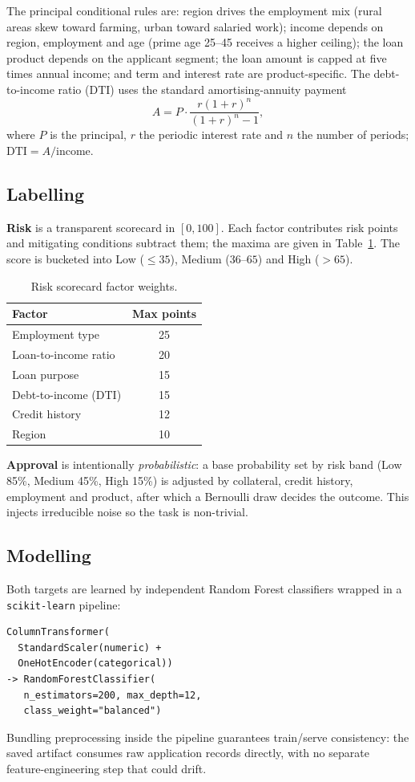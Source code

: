 \documentclass[conference]{IEEEtran}
\begin{document}
The principal conditional rules are: region drives the employment mix (rural
areas skew toward farming, urban toward salaried work); income depends on
region, employment and age (prime age 25--45 receives a higher ceiling); the
loan product depends on the applicant segment; the loan amount is capped at five
times annual income; and term and interest rate are product-specific. The
debt-to-income ratio (DTI) uses the standard amortising-annuity payment
\begin{equation}
A = P \cdot \frac{r(1+r)^{n}}{(1+r)^{n}-1},
\end{equation}
where $P$ is the principal, $r$ the periodic interest rate and $n$ the number of
periods; $\text{DTI} = A / \text{income}$.

\subsection{Labelling}
\textbf{Risk} is a transparent scorecard in $[0,100]$. Each factor contributes
risk points and mitigating conditions subtract them; the maxima are given in
Table~\ref{tab:scorecard}. The score is bucketed into Low ($\le 35$),
Medium ($36$--$65$) and High ($>65$).

\begin{table}[t]
\caption{Risk scorecard factor weights.}
\label{tab:scorecard}
\centering
\renewcommand{\arraystretch}{1.2}
\begin{tabular}{lc}
\toprule
\textbf{Factor} & \textbf{Max points} \\
\midrule
Employment type        & 25 \\
Loan-to-income ratio    & 20 \\
Loan purpose            & 15 \\
Debt-to-income (DTI)    & 15 \\
Credit history          & 12 \\
Region                  & 10 \\
\bottomrule
\end{tabular}
\end{table}

\textbf{Approval} is intentionally \emph{probabilistic}: a base probability set
by risk band (Low 85\%, Medium 45\%, High 15\%) is adjusted by collateral,
credit history, employment and product, after which a Bernoulli draw decides the
outcome. This injects irreducible noise so the task is non-trivial.

\subsection{Modelling}
Both targets are learned by independent Random Forest classifiers wrapped in a
\texttt{scikit-learn} pipeline:
\begin{lstlisting}
ColumnTransformer(
  StandardScaler(numeric) +
  OneHotEncoder(categorical))
-> RandomForestClassifier(
   n_estimators=200, max_depth=12,
   class_weight="balanced")
\end{lstlisting}
Bundling preprocessing inside the pipeline guarantees train/serve consistency:
the saved artifact consumes raw application records directly, with no separate
feature-engineering step that could drift.
\end{document}
